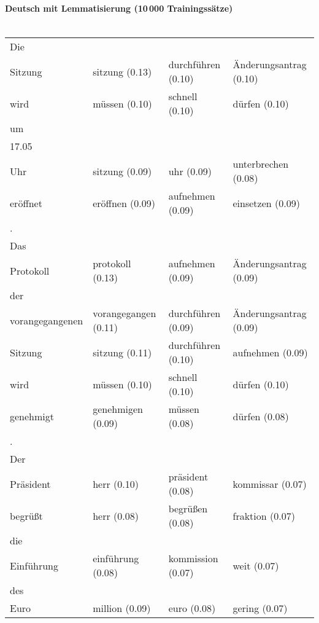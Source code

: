 \documentclass[11pt,twoside,openright]{mpreport}
\begin{document}
\paragraph{Deutsch mit Lemmatisierung (10\,000 Trainingssätze)\\\\}
\begin{table}[H]
\hspace{-2.7cm}\begin{footnotesize}\begin{tabular}{|llll|}
\hline
Die & & & \\
Sitzung                 & sitzung (0.13) & durchführen (0.10) & Änderungsantrag (0.10) \\
wird                    & müssen (0.10) & schnell (0.10) & dürfen (0.10) \\
um & & & \\
17.05 & & & \\
Uhr                     & sitzung (0.09) & uhr (0.09) & unterbrechen (0.08) \\
eröffnet               & eröffnen (0.09) & aufnehmen (0.09) & einsetzen (0.09) \\
. & & & \\
Das & & & \\
Protokoll               & protokoll (0.13) & aufnehmen (0.09) & Änderungsantrag (0.09) \\
der & & & \\
vorangegangenen         & vorangegangen (0.11) & durchführen (0.09) & Änderungsantrag (0.09) \\
Sitzung                 & sitzung (0.11) & durchführen (0.10) & aufnehmen (0.09) \\
wird                    & müssen (0.10) & schnell (0.10) & dürfen (0.10) \\
genehmigt               & genehmigen (0.09) & müssen (0.08) & dürfen (0.08) \\
. & & & \\
Der & & & \\
Präsident              & herr (0.10) & präsident (0.08) & kommissar (0.07) \\
begrüßt               & herr (0.08) & begrüßen (0.08) & fraktion (0.07) \\
die & & & \\
Einführung             & einführung (0.08) & kommission (0.07) & weit (0.07) \\
des & & & \\
Euro                    & million (0.09) & euro (0.08) & gering (0.07) \\

\end{tabular}
\end{footnotesize}
\end{table}
\end{document}
